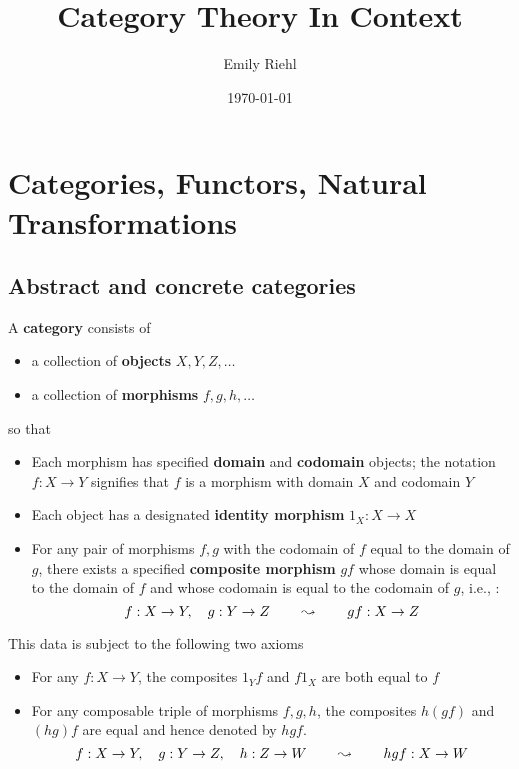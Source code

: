 \documentclass[11pt]{article}
\author{Emily Riehl}
\date{\today}
\title{Category Theory In Context}
\begin{document}
\maketitle
\tableofcontents


\section{Categories, Functors, Natural Transformations}
\label{sec:org545e280}
\subsection{Abstract and concrete categories}
\label{sec:org15a7cdd}
\begin{definition}[]
A \textbf{category} consists of
\begin{itemize}
\item a collection of \textbf{objects} \(X,Y,Z,\dots\)
\item a collection of \textbf{morphisms} \(f,g,h,\dots\)
\end{itemize}


so that
\begin{itemize}
\item Each morphism has specified \textbf{domain} and \textbf{codomain} objects; the notation \(f:X\to Y\)
signifies that \(f\) is a morphism with domain \(X\) and codomain \(Y\)
\item Each object has a designated \textbf{identity morphism} \(1_X:X\to X\)
\item For any pair of morphisms \(f,g\) with the codomain of \(f\) equal to the domain of \(g\),
there exists a specified \textbf{composite morphism} \(gf\) whose domain is equal to the domain
of \(f\) and whose codomain is equal to the codomain of \(g\), i.e., :
\begin{equation*}
f:X\to Y,\quad g:Y\to Z\hspace{0.7cm}\leadsto\hspace{0.7cm}gf:X\to Z
\end{equation*}
\end{itemize}


This data is subject to the following two axioms
\begin{itemize}
\item For any \(f:X\to Y\), the composites \(1_Yf\) and \(f1_X\) are both equal to \(f\)
\item For any composable triple of morphisms \(f,g,h\), the composites \(h(gf)\) and \((hg)f\) are
equal and hence denoted by \(hgf\).
\begin{equation*}
f:X\to Y,\quad g:Y\to Z,\quad h:Z\to W\hspace{0.7cm}\leadsto\hspace{0.7cm}hgf:X\to W
\end{equation*}
\end{itemize}
\end{definition}
\end{document}

